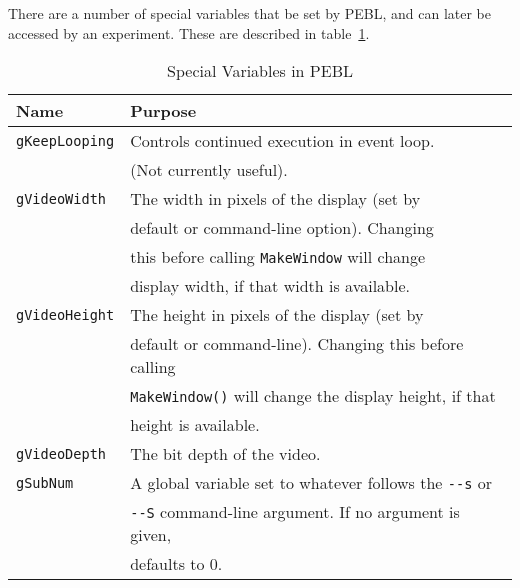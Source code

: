 There are a number of special variables that be set by PEBL, 
and can later be accessed by an experiment. These are described in table~\ref{tab:special}.

\begin{table}[htbp]
\caption{Special Variables in PEBL}

\begin{tabular}{ll}
\toprule
\textbf{Name}&\textbf{Purpose}\\
\midrule
\verb+gKeepLooping+ & Controls continued execution in event loop. \\
 &           (Not currently useful).\\
\addlinespace[.2cm]
\verb+gVideoWidth+  &	The width in pixels of the display (set by\\
             &  default or command-line option). Changing \\
             &  this before calling \verb+MakeWindow+ will change \\
             &  display width, if that width is available. \\
\addlinespace[.2cm]
\verb+gVideoHeight+ & 	The height in pixels of the display (set by\\
             & 	default or command-line). Changing this before calling \\
             &  \verb+MakeWindow()+ will change the display height, if that \\
             &  height is available.\\
\addlinespace[.2cm]
\verb+gVideoDepth+    &      	The bit depth of the video.\\

\addlinespace[.2cm]
\verb+gSubNum+      &  A global variable set to whatever follows the \verb+--s+ or \\
             & \verb+--S+ command-line argument.  If no argument is given, \\
             & defaults to 0.\\
\bottomrule
\end{tabular}
\label{tab:special}
\end{table}






